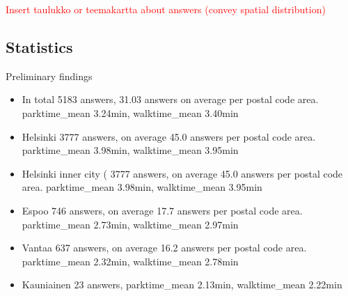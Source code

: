 \textcolor{red}{Insert taulukko or teemakartta about answers (convey spatial distribution)}

\subsection{Statistics}
\justify

Preliminary findings
\begin{itemize}
    \item In total 5183 answers, 31.03 answers on average per postal code area. parktime\_mean 3.24min, walktime\_mean 3.40min
    \item Helsinki 3777 answers, on average 45.0 answers per postal code area. parktime\_mean 3.98min, walktime\_mean 3.95min
    \item Helsinki inner city ( 3777 answers, on average 45.0 answers per postal code area. parktime\_mean 3.98min, walktime\_mean 3.95min
    \item Espoo 746 answers, on average 17.7 answers per postal code area. parktime\_mean 2.73min, walktime\_mean 2.97min
    \item Vantaa 637 answers, on average 16.2 answers per postal code area. parktime\_mean 2.32min, walktime\_mean 2.78min
    \item Kauniainen 23 answers, parktime\_mean 2.13min, walktime\_mean 2.22min
\end{itemize}